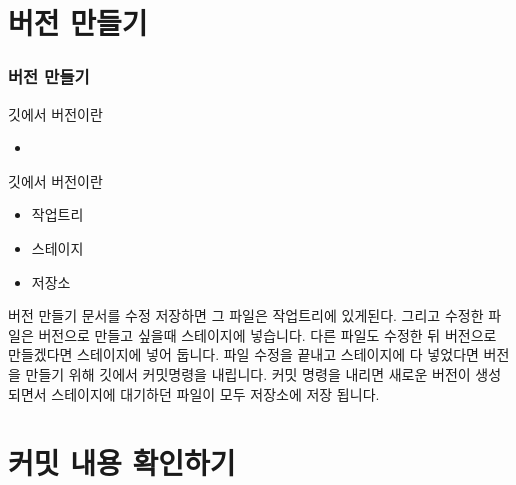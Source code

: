 \documentclass[aspectratio=1610,20pt,xcolor=pdftex,dvipsnames,table,handout]{beamer}
\begin{document}
		\section{버전 만들기}

		\begin{frame} [t,plain]
		\frametitle{버전 만들기}

			\begin{block} {깃에서 버전이란}
			\setlength{\leftmargini}{2em}			
			\begin{itemize}
				\item 
			\end{itemize}
			\end{block}	


			\begin{block} {깃에서 버전이란}
			\setlength{\leftmargini}{2em}			
			\begin{itemize}
				\item 작업트리
				\item 스테이지
				\item 저장소
			\end{itemize}
			\end{block}	

				
		\end{frame}						


		\begin{frame} [t,plain]

			\begin{block} {버전 만들기}
문서를 수정 저장하면 그 파일은 작업트리에 있게된다.
그리고 수정한 파일은 버전으로 만들고 싶을때 스테이지에 넣습니다.
다른 파일도 수정한 뒤 버전으로 만들겠다면 스테이지에 넣어 둡니다.
파일 수정을 끝내고 스테이지에 다 넣었다면 버전을 만들기 위해 깃에서 커밋명령을 내립니다.
커밋 명령을 내리면 새로운 버전이 생성되면서 스테이지에 대기하던 파일이 모두 저장소에 저장 됩니다.
			\end{block}	



					
		\end{frame}						

		\section{커밋 내용 확인하기}
\end{document}
